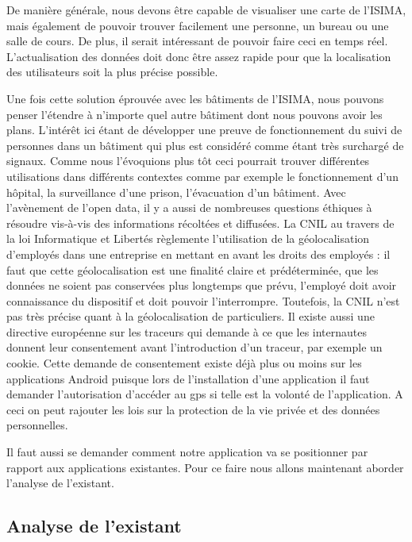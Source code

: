De manière générale, nous devons être capable de visualiser une carte de l'ISIMA, mais également de pouvoir trouver facilement une personne, un bureau ou une salle de cours. De plus, il serait intéressant de pouvoir faire ceci en temps réel. L'actualisation des données doit donc être assez rapide pour que la localisation des utilisateurs soit la plus précise possible.

Une fois cette solution éprouvée avec les bâtiments de l'ISIMA, nous pouvons penser l'étendre à n'importe quel autre bâtiment dont nous pouvons avoir les plans. L’intérêt ici étant de développer une preuve de fonctionnement du suivi de personnes dans un bâtiment qui plus est considéré comme étant très surchargé de signaux. Comme nous l’évoquions plus tôt ceci pourrait trouver différentes utilisations dans différents contextes comme par exemple le fonctionnement d’un hôpital, la surveillance d’une prison, l’évacuation d’un bâtiment. Avec l’avènement de l’open data, il y a aussi de nombreuses questions éthiques à résoudre vis-à-vis des informations récoltées et diffusées. La CNIL au travers de la loi Informatique et Libertés règlemente l'utilisation de la géolocalisation d'employés dans une entreprise \cite{loigeo} en mettant en avant les droits des employés : il faut que cette géolocalisation est une finalité claire et prédéterminée, que les données ne soient pas conservées plus longtemps que prévu, l'employé doit avoir connaissance du dispositif et doit pouvoir l'interrompre. Toutefois, la CNIL n'est pas très précise quant à la géolocalisation de particuliers. Il existe aussi une directive européenne sur les traceurs \cite{cookies} qui demande à ce que les internautes donnent leur consentement avant l'introduction d'un traceur, par exemple un cookie. Cette demande de consentement existe déjà plus ou moins sur les applications Android puisque lors de l'installation d'une application il faut demander l'autorisation d'accéder au gps si telle est la volonté de l'application. A ceci on peut rajouter les lois sur la protection de la vie privée et des données personnelles.

Il faut aussi se demander comment notre application va se positionner par rapport aux applications existantes. Pour ce faire nous allons maintenant aborder l’analyse de l’existant.


\subsection{Analyse de l'existant}

